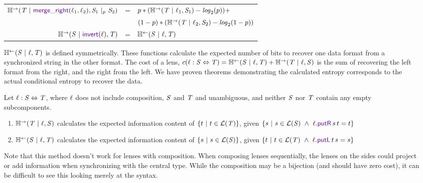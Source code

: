 \documentclass[acmsmall,screen,anonymous]{acmart}
\begin{document}
\begin{center}
\begin{tabular}{rcl}
    $\REntropyOf{\RegexAlt \Given \MergeROf{\Lens_1}{\Lens_2}, \PRegexOr{\Regex_1}{\Regex_2}{\Probability}}$
    & =
    & $p*(\mathbb{H}^\rightarrow(\mathit{T} ~|~ \mathit{\ell}_1, \mathit{S}_1) - \mathit{log}_2(p)) + $\\
    &
    & $(1-p)*(\mathbb{H}^\rightarrow(\mathit{T} ~|~ \mathit{\ell}_2, \mathit{S}_2) - \mathit{log}_2(1 - p))$\\
    
    $\REntropyOf{\Regex \Given \InvertOf{\Lens}, \RegexAlt}$
    & =
    & $\mathbb{H}^\leftarrow(\mathit{S} ~|~ \mathit{\ell}, \mathit{T})$\\
  \end{tabular}
\end{center}
$\mathbb{H}^\leftarrow(\mathit{S} ~|~ \mathit{\ell}, \mathit{T})$ is defined symmetrically.  These
functions calculate the expected number of bits to recover one data format from
a synchronized string in the other format.
The cost of a lens, $c(\mathit{\ell} : \mathit{S} \Leftrightarrow \mathit{T}) =
\mathbb{H}^\leftarrow(\mathit{S} ~|~ \mathit{\ell}, \mathit{T}) + \mathbb{H}^\rightarrow(\mathit{T} ~|~
  \mathit{\ell}, \mathit{S})$ is the
sum of recovering the left format from the right, and the right from the left.
We have proven theorems demonstrating the calculated entropy corresponds to the
actual conditional entropy to recover the data. 

\begin{theorem}
  Let $\mathit{\ell} : \mathit{S} \Leftrightarrow \mathit{T}$, where $\mathit{\ell}$ does not
  include composition, $\mathit{S}$ and $\mathit{T}$ and unambiguous, and neither
  $\mathit{S}$ nor $\mathit{T}$ contain any empty subcomponents.
  \begin{enumerate}
  \item $\mathbb{H}^\rightarrow(\mathit{T} ~|~ \mathit{\ell}, \mathit{S})$ calculates the expected
    information content of $\{t ~|~ t \in \mathcal{L}(\mathit{T})\}$,
    given $\SetOf{s \SuchThat s \in \LanguageOf{\Regex} \BooleanAnd
      \Lens.\PutROf{s}{t} = t}$
  \item $\mathbb{H}^\leftarrow(\mathit{S} ~|~ \mathit{\ell}, \mathit{T})$ calculates the expected
    information content of $\{s ~|~ s \in \mathcal{L}(\mathit{S})\}$,
    given $\SetOf{t \SuchThat t \in \LanguageOf{\RegexAlt} \BooleanAnd
      \Lens.\PutLOf{t}{s} = s}$
  \end{enumerate}
\end{theorem}

Note that this method doesn't work for lenses with composition. When composing
lenses sequentially, the lenses on the sides could project or add information
when synchronizing with the central type. While the composition may be a
bijection (and should have zero cost), it can be difficult to see this looking
merely at the syntax.
\end{document}
